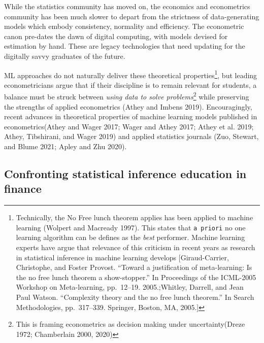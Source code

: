 \documentclass{article}
\begin{document}
While the statistics community has moved on, the economics and
econometrics community has been much slower to depart from the
strictness of data-generating models which embody consistency, normality
and efficiency. The econometric canon pre-dates the dawn of digital
computing, with models devised for estimation by hand. These are legacy
technologies that need updating for the digitally savvy graduates of the
future.

ML approaches do not naturally deliver these theoretical
properties\footnote{Technically, the No Free lunch theorem applies has
  been applied to machine learning (Wolpert and Macready 1997). This
  states that \texttt{a\ priori} no one learning algorithm can be
  defines as the \emph{best} performer. Machine learning experts have
  argue that relevance of this criticism in recent years as research in
  statistical inference in machine learning develops {[}Giraud-Carrier,
  Christophe, and Foster Provost. ``Toward a justification of
  meta-learning: Is the no free lunch theorem a show-stopper.'' In
  Proceedings of the ICML-2005 Workshop on Meta-learning, pp.~12--19.
  2005.;Whitley, Darrell, and Jean Paul Watson. ``Complexity theory and
  the no free lunch theorem.'' In Search Methodologies, pp.~317--339.
  Springer, Boston, MA, 2005.{]}}, but leading econometricians argue
that if their discipline is to remain relevant for students, a balance
must be struck between \emph{using data to solve problems}\footnote{This
  is framing econometrics as decision making under uncertainty(Dreze
  1972; Chamberlain 2000, 2020)} while preserving the strengths of
applied econometrics (Athey and Imbens 2019). Encouragingly, recent
advances in theoretical properties of machine learning models published
in econometrics(Athey and Wager 2017; Wager and Athey 2017; Athey et al.
2019; Athey, Tibshirani, and Wager 2019) and applied statistics journals
(Zuo, Stewart, and Blume 2021; Apley and Zhu 2020).

\hypertarget{confronting-statistical-inference-education-in-finance}{%
\subsection{Confronting statistical inference education in
finance}\label{confronting-statistical-inference-education-in-finance}}
\end{document}
